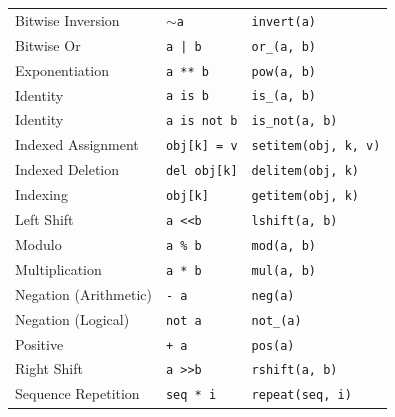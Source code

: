 \documentclass{l4proj}
\begin{document}
{\begin{table}[]
\begin{tabular}{@{}lll@{}}
    Bitwise Inversion     & \texttt{$\sim$a}                        & \texttt{invert(a)}                                    \\
    Bitwise Or            & \texttt{a | b}                          & \texttt{or\_(a, b)}                                   \\
    Exponentiation        & \texttt{a ** b}                         & \texttt{pow(a, b)}                                    \\
    Identity              & \texttt{a is b}                         & \texttt{is\_(a, b)}                                   \\
    Identity              & \texttt{a is not b}                     & \texttt{is\_not(a, b)}                                \\
    Indexed Assignment    & \texttt{obj{[}k{]} = v}                 & \texttt{setitem(obj, k, v)}                           \\
    Indexed Deletion      & \texttt{del obj{[}k{]}}                 & \texttt{delitem(obj, k)}                              \\
    Indexing              & \texttt{obj{[}k{]}}                     & \texttt{getitem(obj, k)}                              \\
    Left Shift            & \texttt{a \textless{}\textless b}       & \texttt{lshift(a, b)}                                 \\
    Modulo                & \texttt{a \% b}                         & \texttt{mod(a, b)}                                    \\
    Multiplication        & \texttt{a * b}                          & \texttt{mul(a, b)}                                    \\
    Negation (Arithmetic) & \texttt{- a}                            & \texttt{neg(a)}                                       \\
    Negation (Logical)    & \texttt{not a}                          & \texttt{not\_(a)}                                     \\
    Positive              & \texttt{+ a}                            & \texttt{pos(a)}                                       \\
    Right Shift           & \texttt{a \textgreater{}\textgreater b} & \texttt{rshift(a, b)}                                 \\
    Sequence Repetition   & \texttt{seq * i}                        & \texttt{repeat(seq, i)}                               \\

\end{tabular}
\end{table}}
\end{document}
